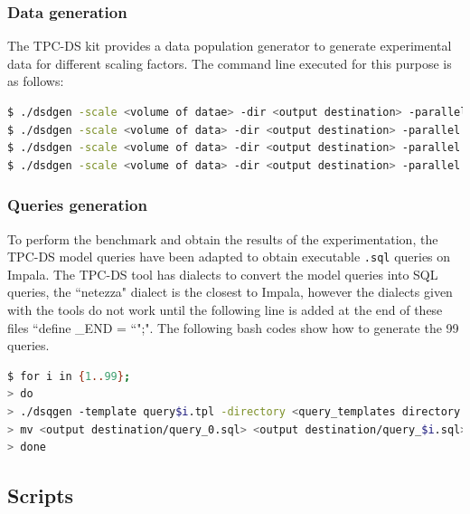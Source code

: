 \documentclass{article}
\newcommand\pcw[1]{\texttt{#1}}
\begin{document}
\subsubsection{Data generation}
The TPC-DS kit provides a data population generator to generate experimental data for different scaling factors. The command line executed for this purpose is as follows:
\vspace{0.5cm}
\begin{lstlisting}[language=bash]
$ ./dsdgen -scale <volume of datae> -dir <output destination> -parallel 4 -child 1 &
$ ./dsdgen -scale <volume of data> -dir <output destination> -parallel 4 -child 2 &
$ ./dsdgen -scale <volume of data> -dir <output destination> -parallel 4 -child 3 &
$ ./dsdgen -scale <volume of data> -dir <output destination> -parallel 4 -child 4
\end{lstlisting}

\subsubsection{Queries generation}

To perform the benchmark and obtain the results of the experimentation, the TPC-DS model queries have been adapted to obtain executable \pcw{.sql} queries on Impala. The TPC-DS tool has dialects to convert the model queries into SQL queries, the ``netezza" dialect is the closest to Impala, however the dialects given with the tools do not work until the following line is added at the end of these files ``define \_END = ``";". The following bash codes show how to generate the 99 queries.


\vspace{0.5cm}
\begin{lstlisting}[language=bash]
$ for i in {1..99};
> do 
> ./dsqgen -template query$i.tpl -directory <query_templates directory of TPC-DS tool> -output <output destination> -dialect netezza -scale <volume of data>; 
> mv <output destination/query_0.sql> <output destination/query_$i.sql>;
> done
\end{lstlisting}



\subsection{Scripts}
\end{document}
